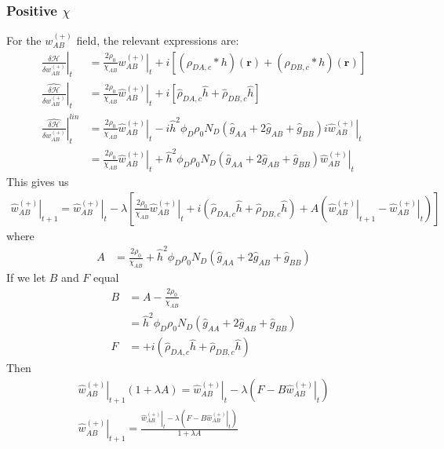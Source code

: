 \documentclass{article}
\begin{document}
    \subsubsection{Positive $\chi$}
  For the $w_{AB}^{(+)}$ field, the relevant expressions are:
  \begin{align*}
    \left. \frac{\delta \mathcal{H}}{\delta  w_{AB}^{(+)} } \right|_t &=
      \frac{2\rho_0}{\chi_{AB}} \left. w_{AB}^{(+)} \right|_t
      + i [ (\rho_{DA,c} \ast h)(\mathbf{r})
            + (\rho_{DB,c} \ast h)(\mathbf{r}) ] \\
      \left. \hat{\frac{\delta \mathcal{H}}{\delta w_{AB}^{(+)}}} \right|_t &=
      \frac{2\rho_0}{\chi_{AB}} \left. \hat{w}_{AB}^{(+)} \right|_t
      + i [ \hat{\rho}_{DA,c} \hat{h}
            + \hat{\rho}_{DB,c} \hat{h} ] \\
    \left. \hat{\frac{\delta \mathcal{H}}{\delta w_{AB}^{(+)}}} \right| ^{lin}_t &=
      \frac{2\rho_0}{\chi_{AB}} \left. \hat{w}_{AB}^{(+)} \right|_t
      - i \hat{h}^2 \phi_D \rho_0 N_D
        (\hat{g}_{AA} + 2 \hat{g}_{AB} + \hat{g}_{BB}) i \left.
          \hat{w}_{AB}^{(+)} \right|_t \\
    &= \frac{2\rho_0}{\chi_{AB}} \left. \hat{w}_{AB}^{(+)} \right|_t
      + \hat{h}^2 \phi_D \rho_0 N_D
        (\hat{g}_{AA} + 2 \hat{g}_{AB} + \hat{g}_{BB})
          \left. \hat{w}_{AB}^{(+)} \right|_t
  \end{align*}
  This gives us
  \begin{align*}
    \left. \hat{w}_{AB}^{(+)} \right|_{t+1} =
      \left. \hat{w}_{AB}^{(+)} \right|_t - \lambda \left[
        \frac{2\rho_0}{\chi_{AB}} \left. \hat{w}_{AB}^{(+)} \right|_t
        + i ( \hat{\rho}_{DA,c} \hat{h}
              + \hat{\rho}_{DB,c} \hat{h} )
        + A ( \left. \hat{w}_{AB}^{(+)} \right|_{t+1}
              - \left. \hat{w}_{AB}^{(+)} \right|_t)
      \right]
  \end{align*}
  where
  \begin{align*}
    A &=
    \frac{2\rho_0}{\chi_{AB}}
        + \hat{h}^2 \phi_D \rho_0 N_D
          (\hat{g}_{AA} + 2 \hat{g}_{AB} + \hat{g}_{BB})
  \end{align*}
  If we let $B$ and $F$ equal
  \begin{align*}
    B &= A - \frac{2\rho_0}{\chi_{AB}} \\
      &= \hat{h}^2 \phi_D \rho_0 N_D
          (\hat{g}_{AA} + 2 \hat{g}_{AB} + \hat{g}_{BB}) \\
    F &= + i ( \hat{\rho}_{DA,c} \hat{h}
              + \hat{\rho}_{DB,c} \hat{h} )
  \end{align*}
  Then
  \begin{align*}
    \left. \hat{w}_{AB}^{(+)} \right|_{t+1} ( 1 + \lambda A ) =
      \left. \hat{w}_{AB}^{(+)} \right|_t
      - \lambda \left( F - B \left. \hat{w}_{AB}^{(+)} \right|_t \right) \\
    \left. \hat{w}_{AB}^{(+)} \right|_{t+1} =
    \frac{\left. \hat{w}_{AB}^{(+)} \right|_t - \lambda
            \left( F - B \left. \hat{w}_{AB}^{(+)} \right|_t \right)}
         {1 + \lambda A}
  \end{align*}
  
\end{document}
